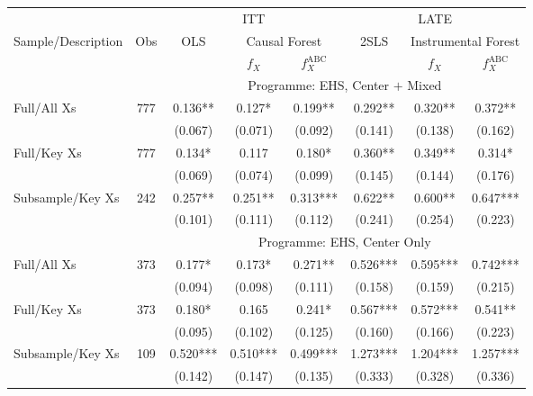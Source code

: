 \begin{tabular}{lccccccc}
\toprule 
\midrule 
\multicolumn{2}{c}{} & \multicolumn{3}{c}{ITT} & \multicolumn{3}{c}{LATE} \\
 \cmidrule(lr){3-5} \cmidrule(lr){6-8} 
Sample/Description & Obs & OLS & \multicolumn{2}{c}{Causal Forest} & 2SLS & \multicolumn{2}{c}{Instrumental Forest} \\
\multicolumn{3}{c}{} & $f_X$ & $f_X^{\text{ABC}}$ &  & $f_X$ & $f_X^{\text{ABC}}$ \\
\midrule 
 &  & \multicolumn{6}{c}{Programme: EHS, Center $+$ Mixed} \\
 \cmidrule(lr){3-8} 
Full/All Xs & 777 & 0.136** & 0.127* & 0.199** & 0.292** & 0.320** & 0.372** \\
 &  & (0.067) & (0.071) & (0.092) & (0.141) & (0.138) & (0.162) \\
Full/Key Xs & 777 & 0.134* & 0.117 & 0.180* & 0.360** & 0.349** & 0.314* \\
 &  & (0.069) & (0.074) & (0.099) & (0.145) & (0.144) & (0.176) \\
Subsample/Key Xs & 242 & 0.257** & 0.251** & 0.313*** & 0.622** & 0.600** & 0.647*** \\
 &  & (0.101) & (0.111) & (0.112) & (0.241) & (0.254) & (0.223) \\
\midrule 
 &  & \multicolumn{6}{c}{Programme: EHS, Center Only} \\
 \cmidrule(lr){3-8} 
Full/All Xs & 373 & 0.177* & 0.173* & 0.271** & 0.526*** & 0.595*** & 0.742*** \\
 &  & (0.094) & (0.098) & (0.111) & (0.158) & (0.159) & (0.215) \\
Full/Key Xs & 373 & 0.180* & 0.165 & 0.241* & 0.567*** & 0.572*** & 0.541** \\
 &  & (0.095) & (0.102) & (0.125) & (0.160) & (0.166) & (0.223) \\
Subsample/Key Xs & 109 & 0.520*** & 0.510*** & 0.499*** & 1.273*** & 1.204*** & 1.257*** \\
 &  & (0.142) & (0.147) & (0.135) & (0.333) & (0.328) & (0.336) \\
\midrule 
\bottomrule 
\end{tabular}
